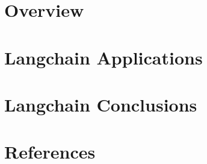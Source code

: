 \section[Overview]{Overview}


\section[Apps]{Langchain Applications}


\section[Concl]{Langchain Conclusions}


\section[Refs]{References}
